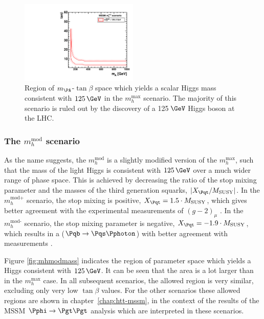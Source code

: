 \begin{figure}[htbp]
   \includegraphics[width=0.5\textwidth]{plots/theory/cmb_mhmax-HypoTest.pdf}
\caption[Region of $m_{\PA}$-$\tan\beta$ space which yields a scalar Higgs mass 
consistent with $125\,\GeV$ in the $m_{h}^{\text{max}}$ scenario.]
{Region of $m_{\PA}$-$\tan\beta$ space which yields a scalar Higgs mass 
consistent with $125\,\GeV$ in the $m_{h}^{\text{max}}$ scenario. The majority of
this scenario is ruled out by the discovery of a 125$\,\GeV$ Higgs boson at the
LHC.}
\label{fig:mhmaxmass}
\end{figure}

\subsubsection{The $m_{h}^{\text{mod}}$ scenario}
\label{sec:mhmodscenario}

As the name suggests, the $m_{h}^{\text{mod}}$ is a slightly modified version of
the $m_{h}^{\text{max}}$, such that the mass of the light Higgs is consistent
with $125\,\GeV$ over a much wider range of phase space. This is achieved by
decreasing the ratio of the stop mixing parameter and the masses of the third
generation squarks, $|X_{\Pqt}/M_{\text{SUSY}}|$. In the $m_{h}^{\text{mod+}}$
scenario, the stop mixing is positive, $X_{\Pqt} = 1.5 \cdot M_{\text{SUSY}}$,
which gives better agreement with the experimental measurements of $(g-2)_{\mu}$
\cite{Miller:2007kk}. In the $m_{h}^{\text{mod-}}$ scenario, the stop mixing parameter is
negative, $X_{\Pqt} = -1.9 \cdot M_{\text{SUSY}}$, which results in a
($\Pqb\to\Pqs\Pphoton$) with better agreement with measurements
\cite{Lees:2012wg}.

Figure \ref{fig:mhmodmass} indicates the region of parameter space which yields
a Higgs consistent with $125\,\GeV$. It can be seen that the area is a lot larger
than in the $m_{h}^{\text{max}}$ case. In all subsequent scenarios, the allowed
region is very similar, excluding only very low $\tan\beta$ values. For the
other scenarios these allowed regions are shown in chapter~\ref{chap:htt-mssm},
in the context of the results of the \ac{MSSM} $\Pphi \to \Pgt\Pgt$ analysis which
are interpreted in these scenarios.

